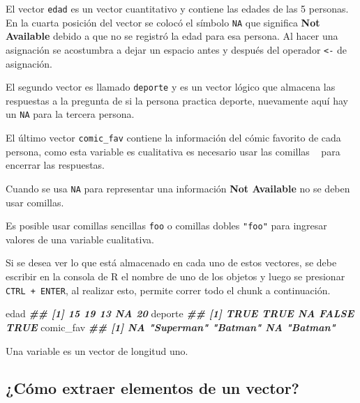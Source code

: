 \documentclass[
]{book}
\makeatletter
\newenvironment{Shaded}{\begin{snugshade}}{\end{snugshade}}
\newcommand{\DocumentationTok}[1]{\textcolor[rgb]{0.56,0.35,0.01}{\textbf{\textit{#1}}}}
\newcommand{\NormalTok}[1]{#1}
\newenvironment{kframe}{%
\medskip{}
\setlength{\fboxsep}{.8em}
 \def\at@end@of@kframe{}%
 \ifinner\ifhmode%
  \def\at@end@of@kframe{\end{minipage}}%
  \begin{minipage}{\columnwidth}%
 \fi\fi%
 \def\FrameCommand##1{\hskip\@totalleftmargin \hskip-\fboxsep
 \colorbox{shadecolor}{##1}\hskip-\fboxsep
     \hskip-\linewidth \hskip-\@totalleftmargin \hskip\columnwidth}%
 \MakeFramed {\advance\hsize-\width
   \@totalleftmargin\z@ \linewidth\hsize
   \@setminipage}}%
 {\par\unskip\endMakeFramed%
 \at@end@of@kframe}
\newenvironment{rmdblock}[1]
  {
  \begin{itemize}
  \renewcommand{\labelitemi}{
    \raisebox{-.7\height}[0pt][0pt]{
      {\setkeys{Gin}{width=3em,keepaspectratio}\texttt{[image: images/\#1]}}
    }
  }
  \setlength{\fboxsep}{1em}
  \begin{kframe}
  \item
  }
  {
  \end{kframe}
  \end{itemize}
  }
\newenvironment{rmdnote}
  {\begin{rmdblock}{note}}
  {\end{rmdblock}}
\newenvironment{rmdwarning}
  {\begin{rmdblock}{warning}}
  {\end{rmdblock}}
\makeatother
\begin{document}
El vector \texttt{edad} es un vector cuantitativo y contiene las edades de las 5 personas. En la cuarta posición del vector se colocó el símbolo \texttt{NA} que significa \textbf{Not Available} debido a que no se registró la edad para esa persona. Al hacer una asignación se acostumbra a dejar un espacio antes y después del operador \texttt{\textless{}-} de asignación.

El segundo vector es llamado \texttt{deporte} y es un vector lógico que almacena las respuestas a la pregunta de si la persona practica deporte, nuevamente aquí hay un \texttt{NA} para la tercera persona.

El último vector \texttt{comic\_fav} contiene la información del cómic favorito de cada persona, como esta variable es cualitativa es necesario usar las comillas \texttt{\textquotesingle{}\ \textquotesingle{}} para encerrar las respuestas.

\begin{rmdwarning}
Cuando se usa \texttt{NA} para representar una información \textbf{Not Available} no se deben usar comillas.
\end{rmdwarning}

\begin{rmdnote}
Es posible usar comillas sencillas \texttt{\textquotesingle{}foo\textquotesingle{}} o comillas dobles \texttt{"foo"} para ingresar valores de una variable cualitativa.
\end{rmdnote}

Si se desea ver lo que está almacenado en cada uno de estos vectores, se debe escribir en la consola de R el nombre de uno de los objetos y luego se presionar \texttt{CTRL\ +\ ENTER}, al realizar esto, permite correr todo el chunk a continuación.

\begin{Shaded}
\begin{Highlighting}[]
\NormalTok{edad}
\DocumentationTok{\#\# [1] 15 19 13 NA 20}
\NormalTok{deporte}
\DocumentationTok{\#\# [1]  TRUE  TRUE    NA FALSE  TRUE}
\NormalTok{comic\_fav}
\DocumentationTok{\#\# [1] NA         "Superman" "Batman"   NA         "Batman"}
\end{Highlighting}
\end{Shaded}

\begin{rmdnote}
Una variable es un vector de longitud uno.
\end{rmdnote}

\hypertarget{cuxf3mo-extraer-elementos-de-un-vector}{%
\subsection{¿Cómo extraer elementos de un vector?}\label{cuxf3mo-extraer-elementos-de-un-vector}}
\end{document}
